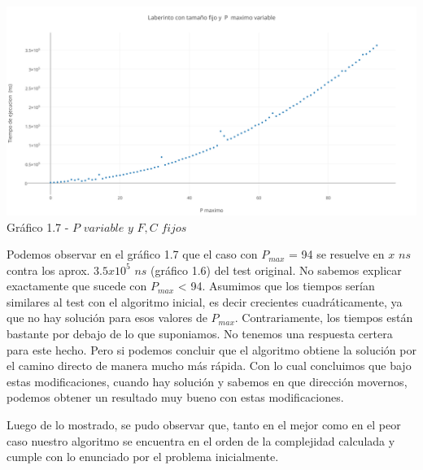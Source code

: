   \begin{center}
\includegraphics[scale=0.5]{./EJ1/pVariable.png}
{Gr\'afico 1.7 - $P$ $variable$ $y$ $F,C$ $fijos$}
  \end{center}
  \vspace*{0.3cm}

Podemos observar en el gráfico 1.7 que el caso con $P_{max}$ = 94 se resuelve en $x$ $ns$ contra los aprox. $3.5x10^5$ $ns$ (gráfico 1.6) del test original. No sabemos explicar exactamente que sucede con $P_{max}$ < 94. Asumimos que los tiempos serían similares al test con el algoritmo inicial, es decir crecientes cuadráticamente, ya que no hay solución para esos valores de $P_{max}$. Contrariamente, los tiempos están bastante por debajo de lo que suponiamos. No tenemos una respuesta certera para este hecho. Pero si podemos concluir que el algoritmo obtiene la solución por el camino directo de manera mucho más rápida. Con lo cual concluimos que bajo estas modificaciones, cuando hay solución y sabemos en que dirección movernos, podemos obtener un resultado muy bueno con estas modificaciones. 

Luego de lo mostrado, se pudo observar que, tanto en el mejor como en el peor caso nuestro algoritmo se encuentra en el orden de la complejidad calculada y cumple con lo enunciado por el problema inicialmente.
